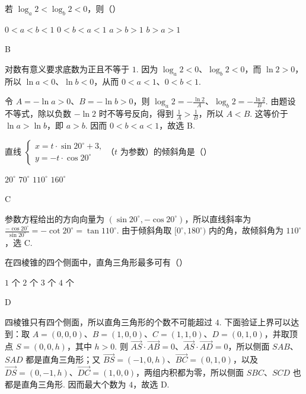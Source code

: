 \begin{problem}
若 \(\log_a 2<\log_b 2<0\)，则（\quad）

\choices
    {\(0<a<b<1\)}
    {\(0<b<a<1\)}
    {\(a>b>1\)}
    {\(b>a>1\)}

\begin{answer}
B
\end{answer}

\begin{solution}
对数有意义要求底数为正且不等于 \(1\). 因为 \(\log_a2<0\)、\(\log_b2<0\)，而 \(\ln2>0\)，所以 \(\ln a<0\)、\(\ln b<0\)，从而 \(0<a<1\)、\(0<b<1\).

令 \(A=-\ln a>0\)、\(B=-\ln b>0\)，则
\(\log_a2=-\frac{\ln2}{A}\)、\(\log_b2=-\frac{\ln2}{B}\). 由题设不等式，除以负数 \(-\ln2\) 时不等号反向，得到 \(\frac1A>\frac1B\)，所以 \(A<B\). 这等价于 \(\ln a>\ln b\)，即 \(a>b\). 因而 \(0<b<a<1\)，故选 B.
\end{solution}
\end{problem}

\begin{problem}
直线 \(\begin{cases}
x=t\cdot \sin 20^{\circ}+3,\\
y=-t\cdot \cos 20^{\circ}
\end{cases}\)（\(t\) 为参数）的倾斜角是（\quad）

\choices
    {\(20^{\circ}\)}
    {\(70^{\circ}\)}
    {\(110^{\circ}\)}
    {\(160^{\circ}\)}

\begin{answer}
C
\end{answer}

\begin{solution}
参数方程给出的方向向量为 \(\left(\sin20^{\circ},-\cos20^{\circ}\right)\)，所以直线斜率为
\(\frac{-\cos20^{\circ}}{\sin20^{\circ}}=-\cot20^{\circ}=\tan110^{\circ}\). 由于倾斜角取 \([0^{\circ},180^{\circ})\) 内的角，故倾斜角为 \(110^{\circ}\)，选 C.
\end{solution}
\end{problem}

\begin{problem}
在四棱锥的四个侧面中，直角三角形最多可有（\quad）

\choices
    {\(1\) 个}
    {\(2\) 个}
    {\(3\) 个}
    {\(4\) 个}

\begin{answer}
D
\end{answer}

\begin{solution}
四棱锥只有四个侧面，所以直角三角形的个数不可能超过 \(4\). 下面验证上界可以达到：取
\(A=(0,0,0)\)、\(B=(1,0,0)\)、\(C=(1,1,0)\)、\(D=(0,1,0)\)，并取顶点 \(S=(0,0,h)\)，其中 \(h>0\). 则
\(\overrightarrow{AS}\cdot\overrightarrow{AB}=0\)、\(\overrightarrow{AS}\cdot\overrightarrow{AD}=0\)，所以侧面 \(SAB\)、\(SAD\) 都是直角三角形；又
\(\overrightarrow{BS}=(-1,0,h)\)、\(\overrightarrow{BC}=(0,1,0)\)，以及 \(\overrightarrow{DS}=(0,-1,h)\)、\(\overrightarrow{DC}=(1,0,0)\)，两组内积都为零，所以侧面 \(SBC\)、\(SCD\) 也都是直角三角形. 因而最大个数为 \(4\)，故选 D.
\end{solution}
\end{problem}

